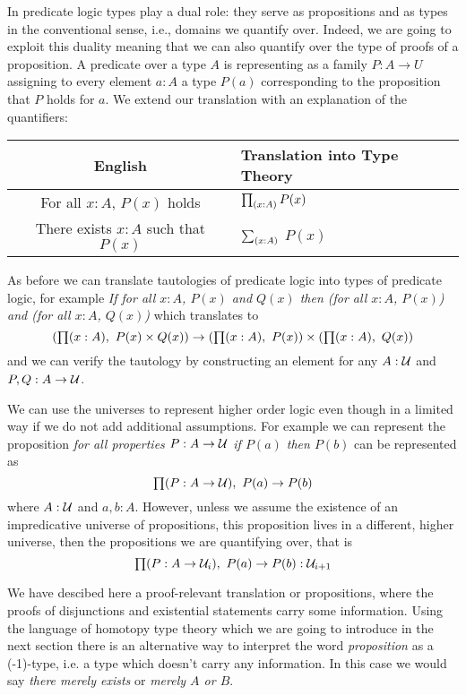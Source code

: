 In predicate logic types play a dual role: they serve as propositions and as types in the conventional sense, i.e., domains we quantify over. Indeed, we are going to exploit this duality meaning that we can also quantify over the type of proofs of a proposition. A predicate over a type $A$ is representing as a family $P : A \to U$ assigning to every element $a : A$ a type $P(a)$ corresponding to the proposition that $P$ holds for $a$. We extend our translation with an explanation of the quantifiers:
\begin{center}
\begin{tabular}{c|l}
  \textbf{English} & \textbf{Translation into Type Theory}\\\hline
  For all $x:A$, $P(x)$ holds & $\prd{x:A} P(x)$ \\
  There exists $x:A$ such that $P(x)$ & $\sm{x:A}$ $P(x)$ \\
\end{tabular}
\end{center}
As before we can translate tautologies of predicate logic into types of predicate logic, for example \emph{If for all $x:A$, $P(x)$ and $Q(x)$ then (for all $x:A$, $P(x)$) and  (for all $x:A$, $Q(x)$)  } which translates to
\[ (\prd{x:A} P(x) \times Q(x)) \to (\prd{x:A} P(x)) \times (\prd{x:A} Q(x)) \]
and we can verify the tautology by constructing an element for any $A:\mathcal{U}$ and $P,Q : A \to \mathcal{U}$. 

We can use the universes to represent higher order logic even though in a limited way if we do not add additional assumptions. For example we can represent the proposition \emph{for all properties $P : A \to \mathcal{U}$ if $P(a)$ then $P(b)$} can be represented as
\[ \prd{P : A \to \UU} P(a) \to P(b) \]
where $A : \mathcal{U}$ and $a,b : A$. However, unless we assume the existence
of an impredicative universe of propositions, this
proposition  lives in a different, higher universe, then the
propositions we are quantifying over, that is
\[ \prd{P : A \to \UU_i} P(a) \to P(b) : \UU_{i+1} \]

We have descibed here a proof-relevant translation or propositions, where the proofs of disjunctions and existential statements carry some information. Using the language of homotopy type theory which we are going to introduce in the next section there is an alternative way to interpret the word \emph{proposition} as a (-1)-type, i.e. a type which doesn't carry any information. In this case we would say \emph{there merely exists} or \emph{merely $A$ or $B$}.






